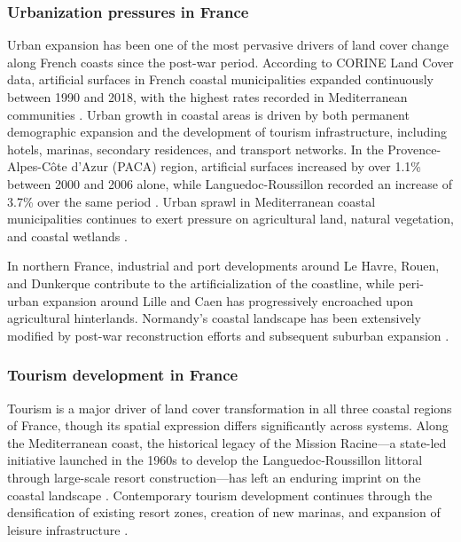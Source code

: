 \documentclass[remotesensing,article,submit,pdftex,moreauthors]{Definitions/mdpi}
\begin{document}
\subsubsection{Urbanization pressures in France}

Urban expansion has been one of the most pervasive drivers of land cover change along French coasts since the post-war period. According to CORINE Land Cover data, artificial surfaces in French coastal municipalities expanded continuously between 1990 and 2018, with the highest rates recorded in Mediterranean communities \citep{EEA_CLC2018, Perrin2016}. Urban growth in coastal areas is driven by both permanent demographic expansion and the development of tourism infrastructure, including hotels, marinas, secondary residences, and transport networks. In the Provence-Alpes-C\^ote d'Azur (PACA) region, artificial surfaces increased by over 1.1\% between 2000 and 2006 alone, while Languedoc-Roussillon recorded an increase of 3.7\% over the same period \citep{Perrin2016}. Urban sprawl in Mediterranean coastal municipalities continues to exert pressure on agricultural land, natural vegetation, and coastal wetlands \citep{Zambon2023, Salvati2014}.

In northern France, industrial and port developments around Le Havre, Rouen, and Dunkerque contribute to the artificialization of the coastline, while peri-urban expansion around Lille and Caen has progressively encroached upon agricultural hinterlands. Normandy's coastal landscape has been extensively modified by post-war reconstruction efforts and subsequent suburban expansion \citep{Burak2004}.

\subsubsection{Tourism development in France}

Tourism is a major driver of land cover transformation in all three coastal regions of France, though its spatial expression differs significantly across systems. Along the Mediterranean coast, the historical legacy of the Mission Racine—a state-led initiative launched in the 1960s to develop the Languedoc-Roussillon littoral through large-scale resort construction—has left an enduring imprint on the coastal landscape \citep{Vlassi2019a, Vlassi2019b}. Contemporary tourism development continues through the densification of existing resort zones, creation of new marinas, and expansion of leisure infrastructure \citep{hatt2020amenagement,bernard2016nautisme}.
\end{document}
